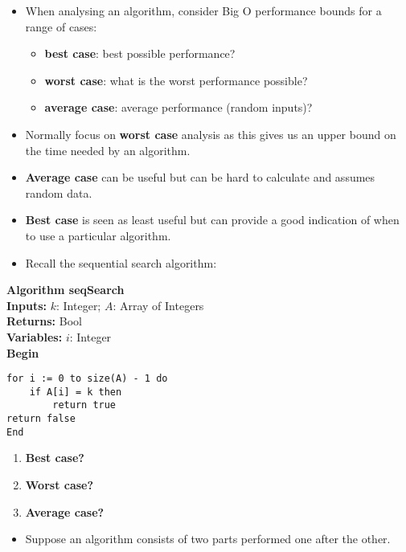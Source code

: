 \documentclass[a4paper,12pt]{article}
\begin{document}
\begin{itemize}
    \item When analysing an algorithm, consider Big O performance bounds for a range of cases:
    \begin{itemize}
        \item \textbf{best case}: best possible performance?
        \item \textbf{worst case}: what is the worst performance possible?
        \item \textbf{average case}: average performance (random inputs)?
    \end{itemize}
    \item Normally focus on \textbf{worst case} analysis as this gives us an upper bound on the time needed by an algorithm.
    \item \textbf{Average case} can be useful but can be hard to calculate and assumes random data.
    \item \textbf{Best case} is seen as least useful but can provide a good indication of when to use a particular algorithm.
\end{itemize}

\newpage

\begin{itemize}
    \item Recall the sequential search algorithm:
\end{itemize}

\textbf{Algorithm seqSearch} \\
\textbf{Inputs:} \( k \): Integer; \( A \): Array of Integers \\
\textbf{Returns:} Bool \\
\textbf{Variables:} \( i \): Integer \\

\textbf{Begin}
\begin{verbatim}
for i := 0 to size(A) - 1 do
    if A[i] = k then
        return true
return false
End
\end{verbatim}

\begin{enumerate}
    \item \textbf{Best case?}
    \item \textbf{Worst case?}
    \item \textbf{Average case?}
\end{enumerate}

\begin{itemize}
    \item Suppose an algorithm consists of two parts performed one after the other.
\end{itemize}
\end{document}
